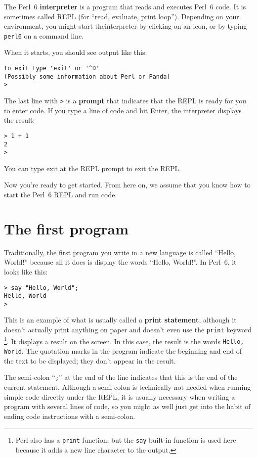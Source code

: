 The Perl~6 {\bf interpreter} is a program that reads and 
executes Perl~6 code. It is sometimes called REPL (for ``read, 
evaluate, print loop''). Depending on your environment, you 
might start theinterpreter by clicking on an icon, or by 
typing {\tt perl6} on a command line.

When it starts, you should see output like this:

\begin{verbatim}
To exit type 'exit' or '^D'
(Possibly some information about Perl or Panda)
> 
\end{verbatim}
%

The last line with {\tt >} is a {\bf prompt} that indicates 
that the REPL is ready for you to enter code. If you type a 
line of code and hit Enter, the interpreter displays the
result: 

\begin{verbatim}
> 1 + 1
2
>
\end{verbatim}
%
You can type exit at the REPL prompt to exit the REPL.

Now you're ready to get started.
From here on, we assume that you know how to start the Perl~6
REPL and run code.


\section{The first program}
\label{hello}

Traditionally, the first program you write in a new language
is called ``Hello, World!'' because all it does is display the
words ``Hello, World!''.  In Perl~6, it looks like this:

\begin{verbatim}
> say "Hello, World";
Hello, World
>
\end{verbatim}
%
This is an example of what is usually called a {\bf print statement}, although it
doesn't actually print anything on paper and doesn't even 
use the {\tt print} keyword \footnote{Perl also has a {\tt print} 
function, but the {\tt say} built-in function is used here 
because it adds a new line character to the output.}.  It 
displays a result on the screen.  In this case, the result is 
the words {\tt Hello, World}.
%
The quotation marks in the program indicate the beginning and end
of the text to be displayed; they don't appear in the result.

The semi-colon ``{\tt ;}'' at the end of the line indicates 
that this is the end of the current statement. Although a 
semi-colon is technically not needed when running 
simple code directly under the REPL, it is usually 
necessary when writing a program with several lines of code, 
so you might as well just get into the habit of ending code 
instructions with a semi-colon.

